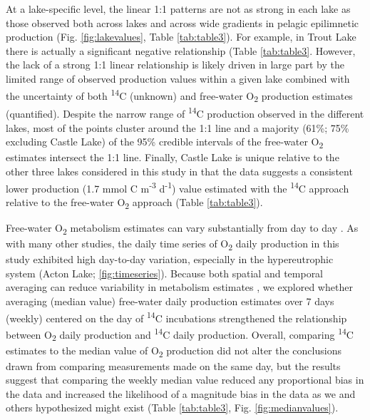 \documentclass[12pt, oneside]{article}
\begin{document}
At a lake-specific level, the linear 1:1 patterns are not as strong in each lake as those observed both across lakes and across wide gradients in pelagic epilimnetic production (Fig. \ref{fig:lakevalues}, Table \ref{tab:table3}). For example, in Trout Lake there is actually a significant negative relationship (Table \ref{tab:table3}. However, the lack of a strong 1:1 linear relationship is likely driven in large part by the limited range of observed production values within a given lake combined with the uncertainty of both \textsuperscript{14}C (unknown) and free-water O\textsubscript{2} production estimates (quantified). Despite the narrow range of \textsuperscript{14}C production observed in the different lakes, most of the points cluster around the 1:1 line and a majority (61\%; 75\% excluding Castle Lake) of the 95\% credible intervals of the free-water O\textsubscript{2} estimates intersect the 1:1 line. Finally, Castle Lake is unique relative to the other three lakes considered in this study in that the data suggests a consistent lower production (1.7 mmol C m\textsuperscript{-3} d\textsuperscript{-1}) value estimated with the \textsuperscript{14}C approach relative to the free-water O\textsubscript{2} approach (Table \ref{tab:table3}).

Free-water O\textsubscript{2} metabolism estimates can vary substantially from day to day \citep{Staehr_Sand-Jensen_2007, staehr_lake_2010, Coloso_Cole_Pace_2011, VandeBogert_Bade_Carpenter_Cole_Pace_Hanson_Langman_2012, solomon_ecosystem_2013}. As with many other studies, the daily time series of O\textsubscript{2} daily production in this study exhibited high day-to-day variation, especially in the hypereutrophic system (Acton Lake; \ref{fig:timeseries}). Because both spatial and temporal averaging can reduce variability in metabolism estimates \citep{staehr_lake_2010, VandeBogert_Bade_Carpenter_Cole_Pace_Hanson_Langman_2012, Richardson_Carey_Bruesewitz_Weathers_2017, Zwart_Sebestyen_Solomon_Jones_2017}, we explored whether averaging (median value) free-water daily production estimates over 7 days (weekly) centered on the day of \textsuperscript{14}C incubations strengthened the relationship between O\textsubscript{2} daily production and \textsuperscript{14}C daily production. Overall, comparing \textsuperscript{14}C estimates to the median value of O\textsubscript{2} production did not alter the conclusions drawn from comparing measurements made on the same day, but the results suggest that comparing the weekly median value reduced any proportional bias in the data and increased the likelihood of a magnitude bias in the data as we and others hypothesized might exist (Table \ref{tab:table3}, Fig. \ref{fig:medianvalues}).
\end{document}
